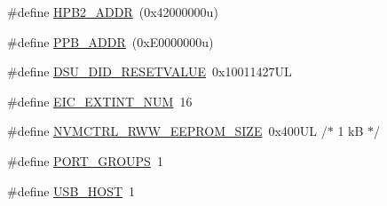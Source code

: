 \begin{DoxyCompactItemize}
\item 
\#define \mbox{\hyperlink{group___s_a_m_d21_e15_b__definitions_gaef42fa53ddf169a2a50be70d29f73571}{H\+P\+B2\+\_\+\+A\+D\+DR}}~(0x42000000u)
\item 
\#define \mbox{\hyperlink{group___s_a_m_d21_e15_b__definitions_ga8895d0a3a9a3126cc44330f86c8ce564}{P\+P\+B\+\_\+\+A\+D\+DR}}~(0x\+E0000000u)
\item 
\#define \mbox{\hyperlink{group___s_a_m_d21_e15_b__definitions_gada75131d542c9e1966238f5488f89bd6}{D\+S\+U\+\_\+\+D\+I\+D\+\_\+\+R\+E\+S\+E\+T\+V\+A\+L\+UE}}~0x10011427\+UL
\item 
\#define \mbox{\hyperlink{group___s_a_m_d21_e15_b__definitions_ga88ebc38c95506296f5d21f82476296ae}{E\+I\+C\+\_\+\+E\+X\+T\+I\+N\+T\+\_\+\+N\+UM}}~16
\item 
\#define \mbox{\hyperlink{group___s_a_m_d21_e15_b__definitions_gacb7a115808eeb0b50bd55888f9ba65ae}{N\+V\+M\+C\+T\+R\+L\+\_\+\+R\+W\+W\+\_\+\+E\+E\+P\+R\+O\+M\+\_\+\+S\+I\+ZE}}~0x400\+U\+L /$\ast$ 1 k\+B $\ast$/
\item 
\#define \mbox{\hyperlink{group___s_a_m_d21_e15_b__definitions_gab9243ffe03a1dc631b57a495b4b3d467}{P\+O\+R\+T\+\_\+\+G\+R\+O\+U\+PS}}~1
\item 
\#define \mbox{\hyperlink{group___s_a_m_d21_e15_b__definitions_ga856aa08fb33114928cbc8635be1792e4}{U\+S\+B\+\_\+\+H\+O\+ST}}~1
\end{DoxyCompactItemize}
